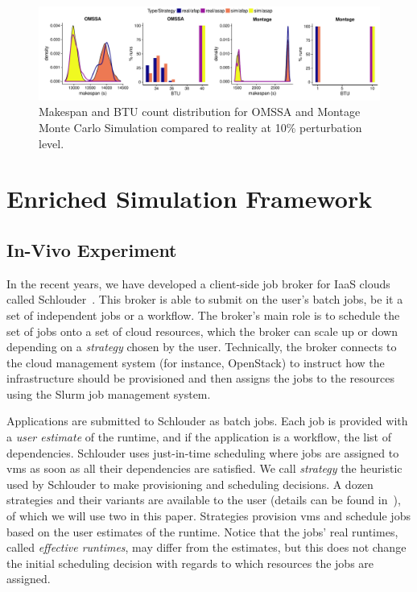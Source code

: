 \documentclass[10pt,conference,compsocconf]{IEEEtran}
\begin{document}
\begin{figure}
	\includegraphics[width=\textwidth]{gfx/fit_plot.pdf}
	\caption{Makespan and BTU count distribution for OMSSA and Montage Monte
	Carlo Simulation compared to reality at 10\% perturbation
	level.}\label{fig:fit}
\end{figure}

\section{Enriched Simulation Framework}
\label{sec:enriched-sim}


\subsection{In-Vivo Experiment}
In the recent years, we have developed a client-side job broker for IaaS clouds
called Schlouder~\cite{Michon17}. This broker is able to submit on the user's 
 batch  jobs, be  it a  set of  independent jobs  or a  workflow.  The
broker's main role is to schedule the set of jobs onto a set of cloud resources,
which the broker can  scale up or down depending on  a \emph{strategy} chosen by
the user.  Technically, the broker connects  to the cloud management system (for
instance, OpenStack) to  instruct how the infrastructure  should be provisioned
and  then assigns  the jobs  to  the resources  using the  Slurm job  management
system. 

Applications are  submitted to Schlouder  as batch jobs. Each job  is provided
with  a  \emph{user estimate}  of  the  runtime, and  if  the  application is  a
workflow, the list of dependencies. Schlouder uses just-in-time scheduling where
jobs  are  assigned   to  \acp{vm}  as  soon  as  all   their  dependencies  are
satisfied.  We call  \emph{strategy} the  heuristic  used by  Schlouder to  make
provisioning and scheduling  decisions.  A dozen strategies and their variants are
available to  the user (details can  be found in~\cite{GenaudG11}), of  which we
will use  two in this  paper. Strategies  provision \acp{vm} and  schedule jobs
based on the user estimates of the runtime. Notice that the jobs' real runtimes,
called \emph{effective runtimes},  may differ from the estimates,  but this does
not change the initial scheduling decision with regards to which resources the 
jobs are assigned.
\end{document}

